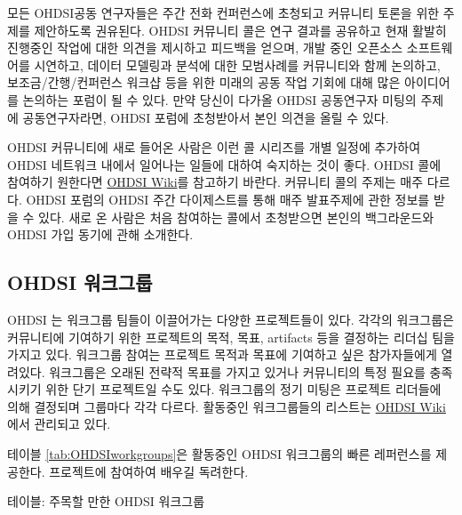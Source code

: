 \documentclass[11pt]{book}
\theoremstyle{definition}
\theoremstyle{definition}
\theoremstyle{definition}
\theoremstyle{remark}
\begin{document}
모든 OHDSI공동 연구자들은 주간 전화 컨퍼런스에 초청되고 커뮤니티 토론을
위한 주제를 제안하도록 권유된다. OHDSI 커뮤니티 콜은 연구 결과를
공유하고 현재 활발히 진행중인 작업에 대한 의견을 제시하고 피드백을
얻으며, 개발 중인 오픈소스 소프트웨어를 시연하고, 데이터 모델링과 분석에
대한 모범사례를 커뮤니티와 함께 논의하고, 보조금/간행/컨퍼런스 워크샵
등을 위한 미래의 공동 작업 기회에 대해 많은 아이디어를 논의하는 포럼이
될 수 있다. 만약 당신이 다가올 OHDSI 공동연구자 미팅의 주제에
공동연구자라면, OHDSI 포럼에 초청받아서 본인 의견을 올릴 수 있다.

OHDSI 커뮤니티에 새로 들어온 사람은 이런 콜 시리즈를 개별 일정에
추가하여 OHDSI 네트워크 내에서 일어나는 일들에 대하여 숙지하는 것이
좋다. OHDSI 콜에 참여하기 원한다면
\href{https://www.ohdsi.org/web/wiki/doku.php?id=projects:ohdsi_community}{OHDSI
Wiki}를 참고하기 바란다. 커뮤니티 콜의 주제는 매주 다르다. OHDSI 포럼의
OHDSI 주간 다이제스트를 통해 매주 발표주제에 관한 정보를 받을 수 있다.
새로 온 사람은 처음 참여하는 콜에서 초청받으면 본인의 백그라운드와 OHDSI
가입 동기에 관해 소개한다. 

\hypertarget{ohdsi-}{\subsection{OHDSI 워크그룹}\label{ohdsi-}}

OHDSI 는 워크그룹 팀들이 이끌어가는 다양한 프로젝트들이 있다. 각각의
워크그룹은 커뮤니티에 기여하기 위한 프로젝트의 목적, 목표, artifacts
등을 결정하는 리더십 팀을 가지고 있다. 워크그룹 참여는 프로젝트 목적과
목표에 기여하고 싶은 참가자들에게 열려있다. 워크그룹은 오래된 전략적
목표를 가지고 있거나 커뮤니티의 특정 필요를 충족시키기 위한 단기
프로젝트일 수도 있다. 워크그룹의 정기 미팅은 프로젝트 리더들에 의해
결정되며 그룹마다 각각 다르다. 활동중인 워크그룹들의 리스트는
\href{https://www.ohdsi.org/web/wiki/doku.php?id=projects:overview}{OHDSI
Wiki}에서 관리되고 있다. 

테이블 \ref{tab:OHDSIworkgroups}은 활동중인 OHDSI 워크그룹의 빠른
레퍼런스를 제공한다. 프로젝트에 참여하여 배우길 독려한다.

테이블: \label{tab:OHDSIworkgroups} 주목할 만한 OHDSI 워크그룹
\end{document}
